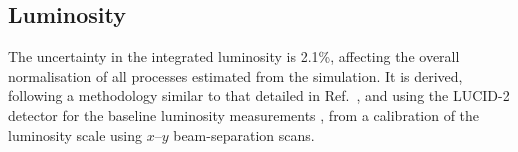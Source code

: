 
\subsection{Luminosity}
\label{sec:syst_lumi}

The uncertainty in the integrated luminosity is 2.1\%, affecting the overall normalisation of all processes estimated from the simulation. 
It is derived, following a methodology similar to that detailed in Ref.~\cite{Aaboud:2016hhf}, and using the LUCID-2 detector 
for the baseline luminosity measurements \cite{Avoni:2018iuv}, from a calibration of the luminosity scale using $x$--$y$ beam-separation scans.


